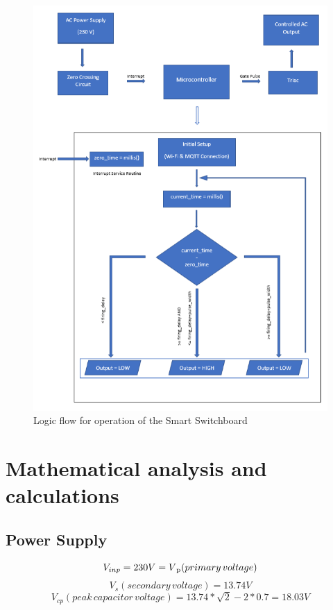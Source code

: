        \begin{figure}[H]
        	\centering
        	\includegraphics[width=\textwidth]{photos/gantt/FlowChart.png}
        	\caption{Logic flow for operation of the Smart Switchboard}
        \end{figure}
        
        
        
        
        \section{Mathematical analysis and calculations}
        \subsection{Power Supply}
       \begin{equation*}
      V_{inp}=230V=V\textsubscript{p} (primary\,voltage) 
      \end{equation*} 
      \begin{equation*}
       V_{s}(secondary\,voltage)=13.74V
             \end{equation*} 
             \begin{equation}
             V_{cp}(peak\,capacitor\,voltage)=13.74*\sqrt{2}-2*0.7 = 18.03V
            \end{equation}
            
